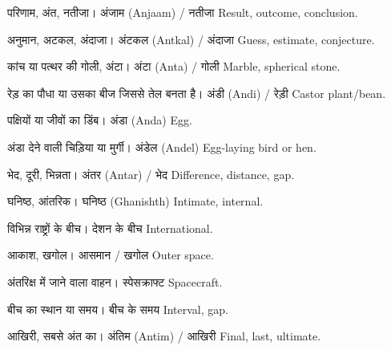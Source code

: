 %
{परिणाम, अंत, नतीजा।}%
{अंजाम (Anjaam) / नतीजा}%
{Result, outcome, conclusion.}

%
{अनुमान, अटकल, अंदाजा।}%
{अंटकल (Antkal) / अंदाजा}%
{Guess, estimate, conjecture.}

%
{कांच या पत्थर की गोली, अंटा।}%
{अंटा (Anta) / गोली}%
{Marble, spherical stone.}

%
{रेड़ का पौधा या उसका बीज जिससे तेल बनता है।}%
{अंडी (Andi) / रेड़ी}%
{Castor plant/bean.}

%
{पक्षियों या जीवों का डिंब।}%
{अंडा (Anda)}%
{Egg.}

%
{अंडा देने वाली चिड़िया या मुर्गी।}%
{अंडेल (Andel)}%
{Egg-laying bird or hen.}

%
{भेद, दूरी, भिन्नता।}%
{अंतर (Antar) / भेद}%
{Difference, distance, gap.}

%
{घनिष्ठ, आंतरिक।}%
{घनिष्ठ (Ghanishth)}%
{Intimate, internal.}

%
{विभिन्न राष्ट्रों के बीच।}%
{देशन के बीच}%
{International.}

%
{आकाश, खगोल।}%
{आसमान / खगोल}%
{Outer space.}

%
{अंतरिक्ष में जाने वाला वाहन।}%
{स्पेसक्राफ्ट}%
{Spacecraft.}

%
{बीच का स्थान या समय।}%
{बीच के समय}%
{Interval, gap.}

%
{आखिरी, सबसे अंत का।}%
{अंतिम (Antim) / आखिरी}%
{Final, last, ultimate.}

